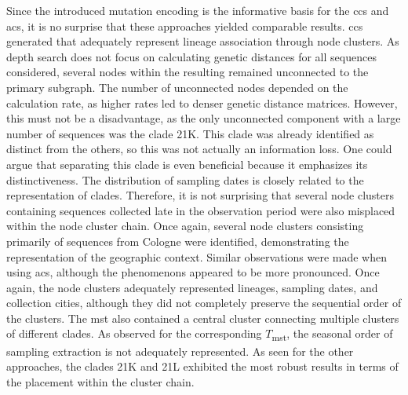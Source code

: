 Since the introduced mutation encoding is the informative basis for the \acrshort{ccs} and \acrshort{acs}, it is no surprise that these approaches yielded comparable results. \acrshort{ccs} generated  that adequately represent lineage association through node clusters. As depth search does not focus on calculating genetic distances for all sequences considered, several nodes within the resulting 
remained unconnected to the primary subgraph. The number of unconnected nodes depended on the calculation rate, as higher rates led to denser genetic distance matrices. However, this must not be a disadvantage, as the only unconnected component with a large number of sequences was the clade 21K. This clade was already identified as distinct from the others, so this was not actually an information loss. One could argue that separating this clade is even beneficial because it emphasizes its distinctiveness. The distribution of sampling dates is closely related to the representation of clades. Therefore, it is not surprising that several node clusters containing sequences collected late in the observation period were also misplaced within the node cluster chain. Once again, several node clusters consisting primarily of sequences from Cologne were identified, demonstrating the representation of the geographic context. Similar observations were made when using \acrshort{acs}, although the phenomenons appeared to be more pronounced. Once again, the node clusters adequately represented lineages, sampling dates, and collection cities, although they did not completely preserve the sequential order of the clusters. The \acrshort{mst} also contained a central cluster connecting multiple clusters of different clades. As observed for the corresponding $T$\textsubscript{mst}, the seasonal order of sampling extraction is not adequately represented. As seen for the other approaches, the clades 21K and 21L exhibited the most robust results in terms of the placement within the cluster chain.

